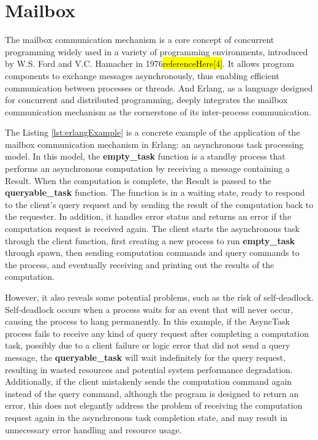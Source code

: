 \documentclass{l4proj}
\begin{document}
\section{Mailbox}
The mailbox communication mechanism is a core concept of concurrent programming widely used in a variety of programming environments, introduced by W.S. Ford and V.C. Hamacher in 1976\colorbox{yellow}{referenceHere[4]}. It allows program components to exchange messages asynchronously, thus enabling efficient communication between processes or threads. And Erlang, as a language designed for concurrent and distributed programming, deeply integrates the mailbox communication mechanism as the cornerstone of its inter-process communication.

The Listing \ref{lst:erlangExample} is a concrete example of the application of the mailbox communication mechanism in Erlang: an asynchronous task processing model. In this model, the \textbf{empty\_task} function is a standby process that performs an asynchronous computation by receiving a message containing a Result. When the computation is complete, the Result is passed to the \textbf{queryable\_task} function. The function is in a waiting state, ready to respond to the client's query request and by sending the result of the computation back to the requester. In addition, it handles error status and returns an error if the computation request is received again. The client starts the asynchronous task through the client function, first creating a new process to run \textbf{empty\_task} through spawn, then sending computation commands and query commands to the process, and eventually receiving and printing out the results of the computation.

However, it also reveals some potential problems, such as the risk of self-deadlock. Self-deadlock occurs when a process waits for an event that will never occur, causing the process to hang permanently. In this example, if the AsyncTask process fails to receive any kind of query request after completing a computation task, possibly due to a client failure or logic error that did not send a query message, the \textbf{queryable\_task} will wait indefinitely for the query request, resulting in wasted resources and potential system performance degradation. Additionally, if the client mistakenly sends the computation command again instead of the query command, although the program is designed to return an error, this does not elegantly address the problem of receiving the computation request again in the asynchronous task completion state, and may result in unnecessary error handling and resource usage.
\end{document}
